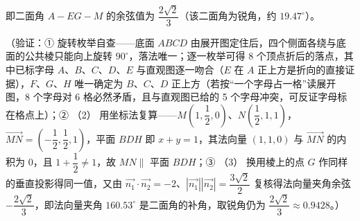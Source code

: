 \begin{answer}
即二面角 \(A-EG-M\) 的余弦值为 \(\dfrac{2\sqrt2}{3}\)（该二面角为锐角，约 \(19.47^{\circ}\)）。

（验证：① 旋转枚举自查——底面 \(ABCD\) 由展开图定住后，四个侧面各绕与底面的公共棱只能向上旋转 \(90^{\circ}\)，落法唯一；逐一枚举可得 8 个顶点折后的落点，其中已标字母 \(A\)、\(B\)、\(C\)、\(D\)、\(E\) 与直观图逐一吻合（\(E\) 在 \(A\) 正上方是折向的直接证据），\(F\)、\(G\)、\(H\) 唯一确定为 \(B\)、\(C\)、\(D\) 正上方（若按“一个字母占一格”读展开图，8 个字母对 6 格必然矛盾，且与直观图已给的 5 个字母冲突，可反证字母标在格点上）；② （2） 用坐标法复算——\(M\left(1,\dfrac12,0\right)\)、\(N\left(\dfrac12,1,1\right)\)，\(\overrightarrow{MN}=\left(-\dfrac12,\dfrac12,1\right)\)，平面 \(BDH\) 即 \(x+y=1\)，其法向量 \((1,1,0)\) 与 \(\overrightarrow{MN}\) 的内积为 \(0\)，且 \(1+\dfrac12\neq1\)，故 \(MN\parallel\) 平面 \(BDH\)；③ （3） 换用棱上的点 \(G\) 作同样的垂直投影得同一值，又由 \(\overrightarrow{n_1}\cdot\overrightarrow{n_2}=-2\)、\(\left|\overrightarrow{n_1}\right|\left|\overrightarrow{n_2}\right|=\dfrac{3\sqrt2}2\) 复核得法向量夹角余弦 \(-\dfrac{2\sqrt2}{3}\)，即法向量夹角 \(160.53^{\circ}\) 是二面角的补角，取锐角仍为 \(\dfrac{2\sqrt2}{3}\approx0.9428\)。）




\end{answer}
